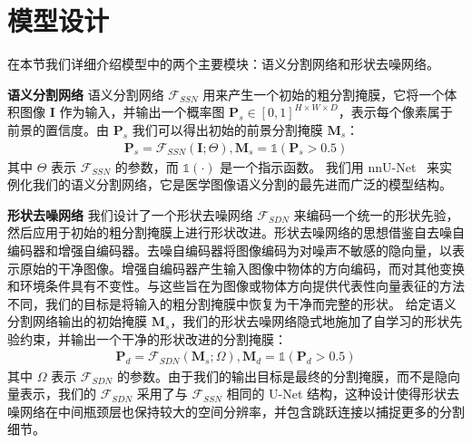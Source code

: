 \section{模型设计}
在本节我们详细介绍模型中的两个主要模块：语义分割网络和形状去噪网络。

\textbf{语义分割网络} \quad 语义分割网络 $\mathcal{F}_{SSN}$ 用来产生一个初始的粗分割掩膜，它将一个体积图像 $\mathbf{I}$ 作为输入，并输出一个概率图 $\mathbf{P}_s \in [0,1]^{H\times W\times D}$，表示每个像素属于前景的置信度。由 $\mathbf{P}_s$ 我们可以得出初始的前景分割掩膜 $\mathbf{M}_s$：
\begin{align}
    \mathbf{P}_s = \mathcal{F}_{SSN} (\mathbf{I}; \Theta), \mathbf{M}_s = \mathds{1} (\mathbf{P}_s > 0.5)
\end{align}
其中 $\Theta$ 表示 $\mathcal{F}_{SSN}$ 的参数，而 $\mathds{1}(\cdot)$ 是一个指示函数。
我们用 nnU-Net~\citep{isensee2019automated} 来实例化我们的语义分割网络，它是医学图像语义分割的最先进而广泛的模型结构。


\textbf{形状去噪网络} \quad 我们设计了一个形状去噪网络 $\mathcal{F}_{SDN}$ 来编码一个统一的形状先验，然后应用于初始的粗分割掩膜上进行形状改进。形状去噪网络的思想借鉴自去噪自编码器\citep{vincent2010stacked}和增强自编码器\citep{Sundermeyer_2018_ECCV}。去噪自编码器将图像编码为对噪声不敏感的隐向量，以表示原始的干净图像。增强自编码器产生输入图像中物体的方向编码，而对其他变换和环境条件具有不变性。与这些旨在为图像或物体方向提供代表性向量表征的方法不同，我们的目标是将输入的粗分割掩膜中恢复为干净而完整的形状。
给定语义分割网络输出的初始掩膜 $\mathbf{M}_s$，我们的形状去噪网络隐式地施加了自学习的形状先验约束，并输出一个干净的形状改进的分割掩膜：
\begin{align}
    \mathbf{P}_d = \mathcal{F}_{SDN} (\mathbf{M}_s; \Omega), \mathbf{M}_d = \mathds{1} (\mathbf{P}_d > 0.5)
\end{align}
其中 $\Omega$ 表示 $\mathcal{F}_{SDN}$ 的参数。由于我们的输出目标是最终的分割掩膜，而不是隐向量表示，我们的 $\mathcal{F}_{SDN}$ 采用了与 $\mathcal{F}_{SSN}$ 相同的 U-Net 结构，这种设计使得形状去噪网络在中间瓶颈层也保持较大的空间分辨率，并包含跳跃连接以捕捉更多的分割细节。

